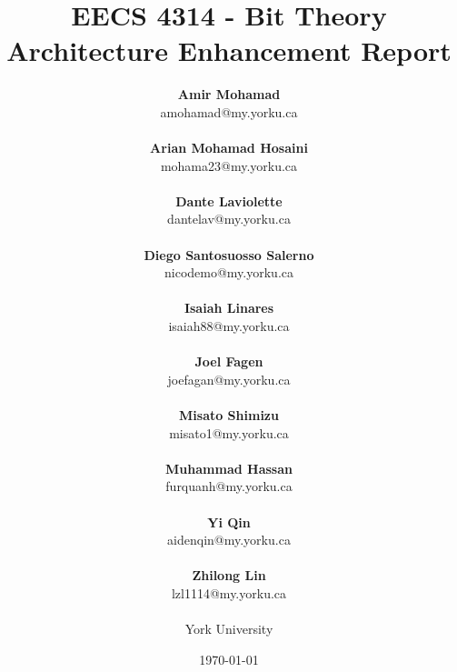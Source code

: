 \documentclass[12pt, dvipsnames, a4paper]{article}
\begin{document}
\title{\textbf{EECS 4314 - Bit Theory\\Architecture Enhancement Report}}
\date{\Large \today}
\author{
	\large \textbf{Amir Mohamad}\\ \small amohamad@my.yorku.ca\\\\
	\large \textbf{Arian Mohamad Hosaini}\\ \small mohama23@my.yorku.ca\\\\
	\large \textbf{Dante Laviolette}\\ \small dantelav@my.yorku.ca\\\\
	\large \textbf{Diego Santosuosso Salerno}\\ \small nicodemo@my.yorku.ca\\\\
	\large \textbf{Isaiah Linares}\\ \small isaiah88@my.yorku.ca\\\\
	\large \textbf{Joel Fagen}\\ \small joefagan@my.yorku.ca\\\\
	\large \textbf{Misato Shimizu}\\ \small misato1@my.yorku.ca\\\\
	\large \textbf{Muhammad Hassan}\\ \small furquanh@my.yorku.ca\\\\
	\large \textbf{Yi Qin}\\ \small aidenqin@my.yorku.ca\\\\
	\large \textbf{Zhilong Lin}\\ \small lzl1114@my.yorku.ca\\\\
	\large York University\\
}
\maketitle
\newpage
\hspace{0pt}
\vfill
\end{document}
